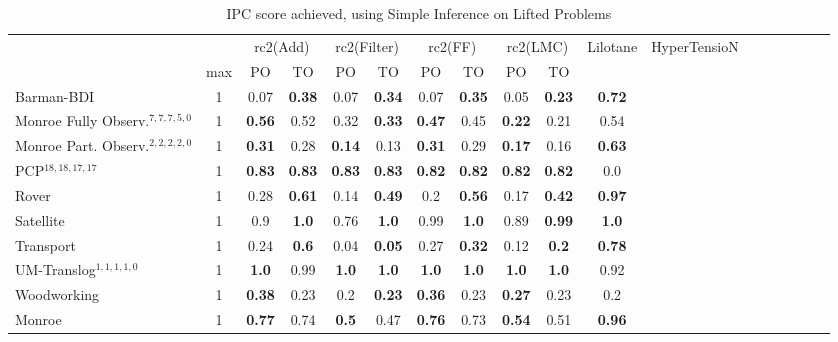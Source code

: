 \documentclass[letterpaper]{article} %
\begin{document}
\begin{table}
	\centering
	\caption{IPC score achieved, using Simple Inference on Lifted Problems}
	\label{table:LiftedSimpleIPC}
	\scalebox{0.6} {
		\begin{tabular}{lccccccccccccccccccl} 
			\toprule 
			&& \multicolumn{2}{c}{rc2(Add)} & \multicolumn{2}{c}{rc2(Filter)} & \multicolumn{2}{c}{rc2(FF)} & \multicolumn{2}{c}{rc2(LMC)}  & \multicolumn{2}{c}{Lilotane} & \multicolumn{2}{c}{HyperTensioN} \\ 
			\cmidrule(lr){3-4} \cmidrule(lr){5-6} \cmidrule(lr){7-8} \cmidrule(lr){9-10} \cmidrule(lr){11-12}   \cmidrule(lr){13-14} 
			& max &PO & TO & PO & TO & PO & TO & PO & TO   \\ 
			\midrule 
			Barman-BDI & 1 & 0.07 & \textbf{0.38} & 0.07 & \textbf{0.34} & 0.07 & \textbf{0.35} & 0.05 & \textbf{0.23} &\multicolumn{2}{c}{ \textbf{0.72}  } \\ 
			Monroe Fully Observ.$^{7,7,7,5,0}$ & 1 & \textbf{0.56} & 0.52 & 0.32 & \textbf{0.33} & \textbf{0.47} & 0.45 & \textbf{0.22} & 0.21 &\multicolumn{2}{c}{ 0.54  } \\ 
			Monroe Part. Observ.$^{2,2,2,2,0}$ & 1 & \textbf{0.31} & 0.28 & \textbf{0.14} & 0.13 & \textbf{0.31} & 0.29 & \textbf{0.17} & 0.16 &\multicolumn{2}{c}{ \textbf{0.63}  } \\ 
			PCP$^{18,18,17,17}$ & 1 & \textbf{0.83} & \textbf{0.83} & \textbf{0.83} & \textbf{0.83} & \textbf{0.82} & \textbf{0.82} & \textbf{0.82} & \textbf{0.82} &\multicolumn{2}{c}{ 0.0  } \\ 
			Rover & 1 & 0.28 & \textbf{0.61} & 0.14 & \textbf{0.49} & 0.2 & \textbf{0.56} & 0.17 & \textbf{0.42} &\multicolumn{2}{c}{ \textbf{0.97}  } \\ 
			Satellite & 1 & 0.9 & \textbf{1.0} & 0.76 & \textbf{1.0} & 0.99 & \textbf{1.0} & 0.89 & \textbf{0.99} &\multicolumn{2}{c}{ \textbf{1.0}  } \\ 
			Transport & 1 & 0.24 & \textbf{0.6} & 0.04 & \textbf{0.05} & 0.27 & \textbf{0.32} & 0.12 & \textbf{0.2} &\multicolumn{2}{c}{ \textbf{0.78}  } \\ 
			UM-Translog$^{1,1,1,1,0}$ & 1 & \textbf{1.0} & 0.99 & \textbf{1.0} & \textbf{1.0} & \textbf{1.0} & \textbf{1.0} & \textbf{1.0} & \textbf{1.0} &\multicolumn{2}{c}{ 0.92  } \\ 
			Woodworking & 1 & \textbf{0.38} & 0.23 & 0.2 & \textbf{0.23} & \textbf{0.36} & 0.23 & \textbf{0.27} & 0.23 &\multicolumn{2}{c}{ 0.2  } \\ 
			\midrule 
			Monroe & 1 & \textbf{0.77} & 0.74 & \textbf{0.5} & 0.47 & \textbf{0.76} & 0.73 & \textbf{0.54} & 0.51 &\multicolumn{2}{c}{ \textbf{0.96}  } \\ 

\end{tabular}}
\end{table}
\end{document}
